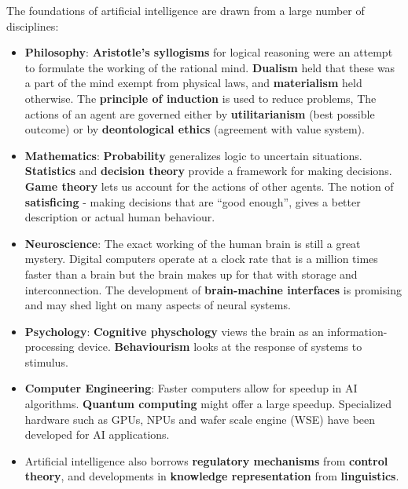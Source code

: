 \documentclass{article}
\begin{document}
The foundations of artificial intelligence are drawn from a large number of disciplines:
\begin{itemize}
    \item {\bf Philosophy}: \textbf{Aristotle's syllogisms} for logical reasoning were an attempt
        to formulate the working of the rational mind. \textbf{Dualism} held that these was a 
        part of the mind exempt from physical laws, and \textbf{materialism} held otherwise.
        The \textbf{principle of induction} is used to reduce problems,
        The actions of an agent are governed either by \textbf{utilitarianism} (best possible outcome)
        or by \textbf{deontological ethics} (agreement with value system).
    
    \item {\bf Mathematics}: \textbf{Probability} generalizes logic to uncertain situations. \textbf{Statistics}
        and \textbf{decision theory} provide a framework for making decisions. \textbf{Game theory} lets us
        account for the actions of other agents. The notion of
        \textbf{satisficing} - making decisions that are ``good enough'', gives a better description
        or actual human behaviour.

    \item {\bf Neuroscience}: The exact working of the human brain is still a great mystery.
        Digital computers operate at a clock rate that is a million times faster than a brain
        but the brain makes up for that with storage and interconnection.
        The development of \textbf{brain-machine interfaces} is promising and may shed light
        on many aspects of neural systems.

    \item {\bf Psychology}: \textbf{Cognitive physchology} views the brain as an information-
        processing device. \textbf{Behaviourism} looks at the response of systems to stimulus.

    \item {\bf Computer Engineering}: Faster computers allow for speedup in AI algorithms.
        \textbf{Quantum computing} might offer a large speedup. Specialized hardware such as
        GPUs, NPUs and wafer scale engine (WSE) have been developed for AI applications.

    \item Artificial intelligence also borrows \textbf{regulatory mechanisms} from {\bf control theory},
        and developments in \textbf{knowledge representation} from {\bf linguistics}.
\end{itemize}
\end{document}
